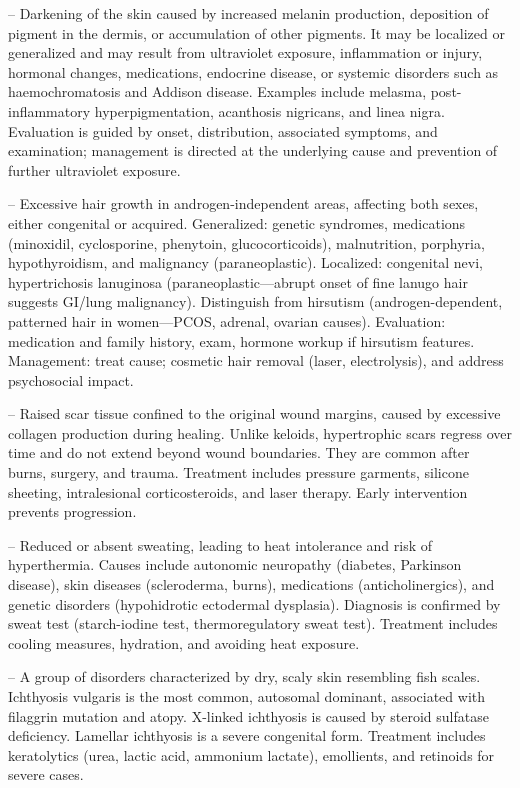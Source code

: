 -- Darkening of the skin caused by increased melanin production, deposition of pigment in the dermis, or accumulation of other pigments. It may be localized or generalized and may result from ultraviolet exposure, inflammation or injury, hormonal changes, medications, endocrine disease, or systemic disorders such as haemochromatosis and Addison disease. Examples include melasma, post-inflammatory hyperpigmentation, acanthosis nigricans, and linea nigra. Evaluation is guided by onset, distribution, associated symptoms, and examination; management is directed at the underlying cause and prevention of further ultraviolet exposure.

-- Excessive hair growth in androgen-independent areas, affecting both sexes, either congenital or acquired. Generalized: genetic syndromes, medications (minoxidil, cyclosporine, phenytoin, glucocorticoids), malnutrition, porphyria, hypothyroidism, and malignancy (paraneoplastic). Localized: congenital nevi, hypertrichosis lanuginosa (paraneoplastic—abrupt onset of fine lanugo hair suggests GI/lung malignancy). Distinguish from hirsutism (androgen-dependent, patterned hair in women—PCOS, adrenal, ovarian causes). Evaluation: medication and family history, exam, hormone workup if hirsutism features. Management: treat cause; cosmetic hair removal (laser, electrolysis), and address psychosocial impact.

-- Raised scar tissue confined to the original wound margins, caused by excessive collagen production during healing. Unlike keloids, hypertrophic scars regress over time and do not extend beyond wound boundaries. They are common after burns, surgery, and trauma. Treatment includes pressure garments, silicone sheeting, intralesional corticosteroids, and laser therapy. Early intervention prevents progression.

-- Reduced or absent sweating, leading to heat intolerance and risk of hyperthermia. Causes include autonomic neuropathy (diabetes, Parkinson disease), skin diseases (scleroderma, burns), medications (anticholinergics), and genetic disorders (hypohidrotic ectodermal dysplasia). Diagnosis is confirmed by sweat test (starch-iodine test, thermoregulatory sweat test). Treatment includes cooling measures, hydration, and avoiding heat exposure.

-- A group of disorders characterized by dry, scaly skin resembling fish scales. Ichthyosis vulgaris is the most common, autosomal dominant, associated with filaggrin mutation and atopy. X-linked ichthyosis is caused by steroid sulfatase deficiency. Lamellar ichthyosis is a severe congenital form. Treatment includes keratolytics (urea, lactic acid, ammonium lactate), emollients, and retinoids for severe cases.

